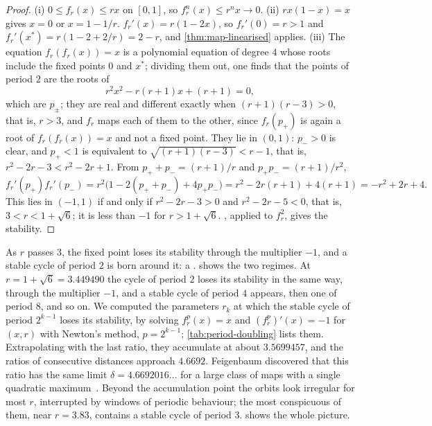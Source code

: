 \begin{proof}
(i) $0\le f_r(x)\le rx$ on $[0,1]$, so $f_r^n(x)\le r^nx\to0$. (ii) $rx(1-x)=x$ gives $x=0$ or $x=1-1/r$. $f_r'(x)=r(1-2x)$, so $f_r'(0)=r>1$ and $f_r'(x^*)=r(1-2+2/r)=2-r$, and \cref{thm:map-linearised} applies. (iii) The equation $f_r(f_r(x))=x$ is a polynomial equation of degree $4$ whose roots include the fixed points $0$ and $x^*$; dividing them out, one finds that the points of period $2$ are the roots of
\[
r^2x^2-r(r+1)x+(r+1)=0 ,
\]
which are $p_\pm$; they are real and different exactly when $(r+1)(r-3)>0$, that is, $r>3$, and $f_r$ maps each of them to the other, since $f_r(p_+)$ is again a root of $f_r(f_r(x))=x$ and not a fixed point. They lie in $(0,1)$: $p_->0$ is clear, and $p_+<1$ is equivalent to $\sqrt{(r+1)(r-3)}<r-1$, that is, $r^2-2r-3<r^2-2r+1$. From $p_++p_-=(r+1)/r$ and $p_+p_-=(r+1)/r^2$,
\[
f_r'(p_+)f_r'(p_-)=r^2\bigl(1-2(p_++p_-)+4p_+p_-\bigr)=r^2-2r(r+1)+4(r+1)=-r^2+2r+4 .
\]
This lies in $(-1,1)$ if and only if $r^2-2r-3>0$ and $r^2-2r-5<0$, that is, $3<r<1+\sqrt6$; it is less than $-1$ for $r>1+\sqrt6$. , applied to $f_r^2$, gives the stability.
\end{proof}

As $r$ passes $3$, the fixed point loses its stability through the multiplier $-1$, and a stable cycle of period $2$ is born around it: a .  shows the two regimes. At $r=1+\sqrt6=3.449490$ the cycle of period $2$ loses its stability in the same way, through the multiplier $-1$, and a stable cycle of period $4$ appears, then one of period $8$, and so on. We computed the parameters $r_k$ at which the stable cycle of period $2^{k-1}$ loses its stability, by solving $f_r^{p}(x)=x$ and $(f_r^{p})'(x)=-1$ for $(x,r)$ with Newton's method, $p=2^{k-1}$; \cref{tab:period-doubling} lists them. Extrapolating with the last ratio, they accumulate at about $3.5699457$, and the ratios of consecutive distances approach $4.6692$. Feigenbaum discovered that this ratio has the same limit $\delta=4.6692016\ldots$ for a large class of maps with a single quadratic maximum~\cite{feigenbaum1978}. Beyond the accumulation point the orbits look irregular for most $r$, interrupted by windows of periodic behaviour; the most conspicuous of them, near $r=3.83$, contains a stable cycle of period $3$.  shows the whole picture.

